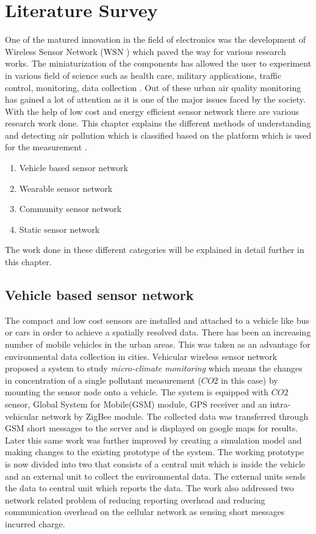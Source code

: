 \chapter{Literature Survey}

One of the matured innovation in the field of electronics was the development of Wireless Sensor Network (WSN ) which paved the way for various research works. The miniaturization of the components has allowed the user to experiment in various field of science such as health care, military applications, traffic control, monitoring, data collection \cite{Khedo2017} \cite{Liu2017}. Out of these urban air quality monitoring has gained a lot of attention as it is one of the major issues faced by the society. With the help of low cost and energy efficient sensor network there are various research work done. This chapter explains the different methods of understanding and detecting air pollution which is classified based on the platform which is used for the measurement\cite{Yi2015} \cite{Pavani2017}.
\begin{enumerate}
    \item Vehicle based sensor network
    \item Wearable sensor network
    \item Community sensor network
    \item Static sensor network
 \end{enumerate} 
 The work done in these different categories will be explained in detail further in this chapter.

\section{Vehicle based sensor network}

The compact and low cost sensors are installed and attached to a vehicle like bus or cars in order to achieve a spatially resolved data. There has been an increasing number of mobile vehicles in the urban areas. This was taken as an advantage for environmental data collection in cities. Vehicular wireless sensor network \cite{Hu2009} proposed a system to study \textit{micro-climate monitoring} which means the changes in concentration of a single pollutant measurement ($CO2$ in this case) by mounting the sensor node onto a vehicle. The system is equipped with $CO2$ sensor, Global System for Mobile(GSM) module, GPS receiver and  an intra-vehicular network by ZigBee module. The collected data was transferred through GSM short messages to the server and is displayed on google maps for results. Later this same work was further improved \cite{Hu2011} by creating a simulation model and making changes to the existing prototype of the system. The working prototype is now divided into two that consists of a central unit which is inside the vehicle and an external unit to collect the environmental data. The external units sends the data to central unit which reports the data. The work also addressed two network related problem of reducing reporting overhead and reducing communication overhead on the cellular network as sensing short messages incurred charge.




